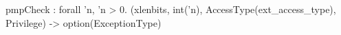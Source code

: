 pmpCheck : forall 'n, 'n > 0. (xlenbits, int('n), AccessType(ext_access_type), Privilege) -> option(ExceptionType)